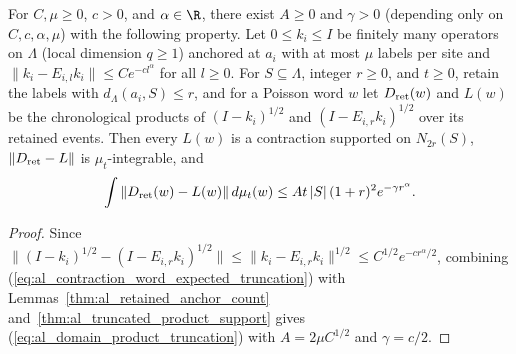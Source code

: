 \begin{lemma}
    \label{thm:al_domain_product_truncation}
    \leanok
    For $C,\mu\ge0$, $c>0$, and $\alpha\in\R$, there exist $A\ge0$ and
    $\gamma>0$ (depending only on $C,c,\alpha,\mu$) with the following
    property. Let $0\le k_i\le I$ be finitely many operators on $\Lambda$
    (local dimension $q\ge1$) anchored at $a_i$ with at most $\mu$ labels
    per site and $\|k_i-E_{i,l}k_i\|\le Ce^{-cl^\alpha}$ for all $l\ge0$.
    For $S\subseteq\Lambda$, integer $r\ge0$, and $t\ge0$, retain the
    labels with $d_\Lambda(a_i,S)\le r$, and for a Poisson word $w$ let
    $D_{\rm ret}(w)$ and $L(w)$ be the chronological products of
    $(I-k_i)^{1/2}$ and $(I-E_{i,r}k_i)^{1/2}$ over its retained events.
    Then every $L(w)$ is a contraction supported on $N_{2r}(S)$,
    $\|D_{\rm ret}-L\|$ is $\mu_t$-integrable, and
    \begin{align}
        \int\|D_{\rm ret}(w)-L(w)\|\,d\mu_t(w)
        \le At\,|S|\,(1+r)^2e^{-\gamma r^\alpha}.
        \label{eq:al_domain_product_truncation}
    \end{align}
\end{lemma}
\begin{proof}\leanok
    Since $\|(I-k_i)^{1/2}-(I-E_{i,r}k_i)^{1/2}\|\le\|k_i-E_{i,r}k_i\|^{1/2}
        \le C^{1/2}e^{-cr^\alpha/2}$, combining
    (\ref{eq:al_contraction_word_expected_truncation}) with
    Lemmas~\ref{thm:al_retained_anchor_count}
    and~\ref{thm:al_truncated_product_support} gives
    (\ref{eq:al_domain_product_truncation}) with $A=2\mu C^{1/2}$ and
    $\gamma=c/2$.
\end{proof}

